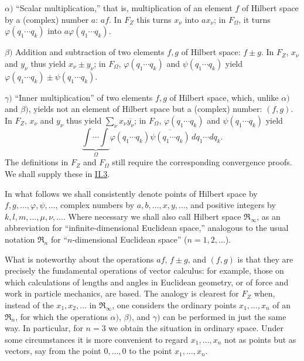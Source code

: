 \documentclass[fontsize=13pt,twoside,openany,headings=normal,parskip=false,bookmarkpackage=false,DIV=calc]{scrbook}
\begin{document}
\hypertarget{origpage-19}{}%
$\alpha)$ ``Scalar multiplication,'' that is, multiplication of an element $f$ of Hilbert space by a (complex) number $a$: $af$. In $F_Z$ this turns $x_\nu$ into $ax_\nu$; in $F_\Omega$, it turns $\varphi(q_1\cdots q_k)$ into $a\varphi(q_1\cdots q_k)$.

$\beta)$ Addition and subtraction of two elements $f,g$ of Hilbert space: $f\pm g$. In $F_Z$, $x_\nu$ and $y_\nu$ thus yield $x_\nu\pm y_\nu$; in $F_\Omega$, $\varphi(q_1\cdots q_k)$ and $\psi(q_1\cdots q_k)$ yield $\varphi(q_1\cdots q_k)\pm\psi(q_1\cdots q_k)$.

$\gamma)$ ``Inner multiplication'' of two elements $f,g$ of Hilbert space, which, unlike $\alpha)$ and $\beta)$, yields not an element of Hilbert space but a (complex) number: $(f,g)$. In $F_Z$, $x_\nu$ and $y_\nu$ thus yield $\sum_\nu x_\nu\overline{y_\nu}$; in $F_\Omega$, $\varphi(q_1\cdots q_k)$ and $\psi(q_1\cdots q_k)$ yield
\[
\underbrace{\int\!\cdots\!\int}_{\Omega}
\varphi(q_1\cdots q_k)\overline{\psi(q_1\cdots q_k)}\,dq_1\cdots dq_k.
\]
The definitions in $F_Z$ and $F_\Omega$ still require the corresponding convergence proofs. We shall supply these in \hyperref[sec:II.3]{II.3}.

In what follows we shall consistently denote points of Hilbert space by $f,g,\ldots,\varphi,\psi,\ldots$, complex numbers by $a,b,\ldots,x,y,\ldots$, and positive integers by $k,l,m,\ldots,\mu,\nu,\ldots$. Where necessary we shall also call Hilbert space $\mathfrak{R}_\infty$, as an abbreviation for ``infinite-dimensional Euclidean space,'' analogous to the usual notation $\mathfrak{R}_n$ for ``$n$-dimensional Euclidean space'' ($n=1,2,\ldots$).

What is noteworthy about the operations $af$, $f\pm g$, and $(f,g)$ is that they are precisely the fundamental operations of vector calculus: for example, those on which calculations of lengths and angles in Euclidean geometry, or of force and work in particle mechanics, are based. The analogy is clearest for $F_Z$ when, instead of the $x_1,x_2,\ldots$ in $\mathfrak{R}_\infty$, one considers the ordinary points $x_1,\ldots,x_n$ of an $\mathfrak{R}_n$, for which the operations $\alpha)$, $\beta)$, and $\gamma)$ can be performed in just the same way. In particular, for $n=3$ we obtain the situation in ordinary space. Under some circumstances it is more convenient to regard $x_1,\ldots,x_n$ not as points but as vectors, say from the point $0,\ldots,0$ to the point $x_1,\ldots,x_n$.
\end{document}
